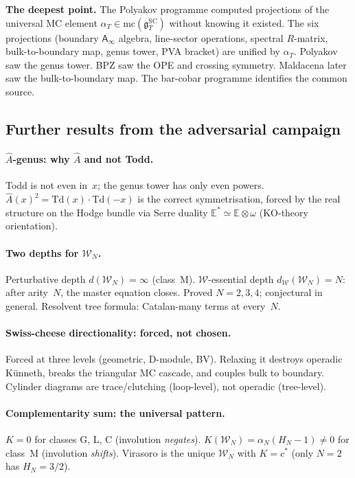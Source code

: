 \documentclass[11pt]{article}
\newcommand{\Ainf}{\mathsf{A}_{\infty}}
\begin{document}
\noindent\textbf{The deepest point.}  The Polyakov programme computed
projections of the universal MC element $\alpha_T \in
\mathrm{mc}(\mathfrak{g}^{\mathrm{SC}}_T)$
without knowing it existed.  The six projections (boundary $\Ainf$
algebra, line-sector operations, spectral $R$-matrix, bulk-to-boundary
map, genus tower, PVA bracket) are unified by $\alpha_T$. Polyakov
saw the genus tower.  BPZ saw the OPE and crossing symmetry.
Maldacena later saw the bulk-to-boundary map.  The bar-cobar
programme identifies the common source.

\subsection{Further results from the adversarial campaign}
\label{subsec:polyakov-further}

\paragraph{$\hat{A}$-genus: why $\hat{A}$ and not Todd.}
Todd is not even in~$x$; the genus tower has only even powers.
$\hat{A}(x)^2 = \mathrm{Td}(x) \cdot \mathrm{Td}(-x)$ is the
correct symmetrisation, forced by the real structure on the Hodge
bundle via Serre duality $\mathbb{E}^* \simeq \mathbb{E} \otimes
\omega$ (KO-theory orientation).

\paragraph{Two depths for $\mathcal{W}_N$.}
Perturbative depth $d(\mathcal{W}_N) = \infty$ (class~M).
$\mathcal{W}$-essential depth $d_{\mathcal{W}}(\mathcal{W}_N) = N$:
after arity~$N$, the master equation closes.  Proved $N = 2,3,4$;
conjectural in general.  Resolvent tree formula: Catalan-many terms
at every~$N$.

\paragraph{Swiss-cheese directionality: forced, not chosen.}
Forced at three levels (geometric, D-module, BV).  Relaxing it
destroys operadic K\"unneth, breaks the triangular MC cascade, and
couples bulk to boundary.  Cylinder diagrams are trace/clutching
(loop-level), not operadic (tree-level).

\paragraph{Complementarity sum: the universal pattern.}
$K = 0$ for classes G, L, C (involution \emph{negates}).
$K(\mathcal{W}_N) = \alpha_N(H_N - 1) \ne 0$ for class~M (involution
\emph{shifts}).  Virasoro is the unique $\mathcal{W}_N$ with
$K = c^*$ (only $N = 2$ has $H_N = 3/2$).
\end{document}
